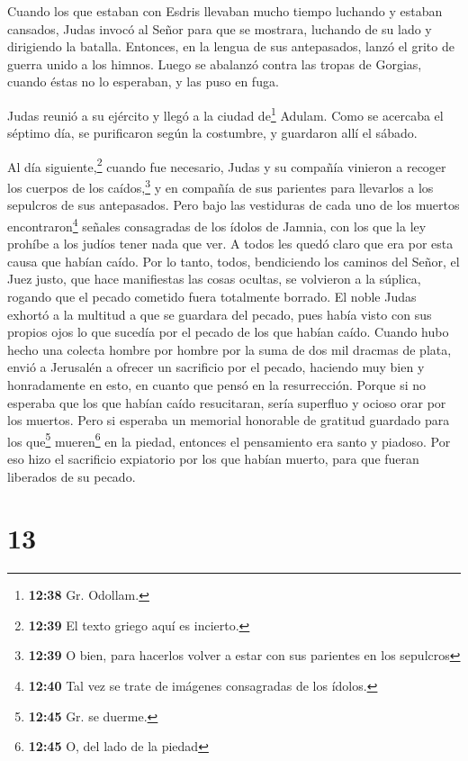  Cuando los que estaban con Esdris llevaban mucho tiempo
luchando y estaban cansados, Judas invocó al Señor para que se mostrara,
luchando de su lado y dirigiendo la batalla.  Entonces,
en la lengua de sus antepasados, lanzó el grito de guerra unido a los
himnos. Luego se abalanzó contra las tropas de Gorgias, cuando éstas no
lo esperaban, y las puso en fuga.

 Judas reunió a su ejército y llegó a la ciudad
de\footnote{\textbf{12:38} Gr. Odollam.} Adulam. Como se acercaba el
séptimo día, se purificaron según la costumbre, y guardaron allí el
sábado.

 Al día siguiente,\footnote{\textbf{12:39} El texto
  griego aquí es incierto.} cuando fue necesario, Judas y su compañía
vinieron a recoger los cuerpos de los caídos,\footnote{\textbf{12:39} O
  bien, para hacerlos volver a estar con sus parientes en los sepulcros}
y en compañía de sus parientes para llevarlos a los sepulcros de sus
antepasados.  Pero bajo las vestiduras de cada uno de los
muertos encontraron\footnote{\textbf{12:40} Tal vez se trate de imágenes
  consagradas de los ídolos.} señales consagradas de los ídolos de
Jamnia, con los que la ley prohíbe a los judíos tener nada que ver. A
todos les quedó claro que era por esta causa que habían caído.
 Por lo tanto, todos, bendiciendo los caminos del Señor,
el Juez justo, que hace manifiestas las cosas ocultas, 
se volvieron a la súplica, rogando que el pecado cometido fuera
totalmente borrado. El noble Judas exhortó a la multitud a que se
guardara del pecado, pues había visto con sus propios ojos lo que
sucedía por el pecado de los que habían caído.  Cuando
hubo hecho una colecta hombre por hombre por la suma de dos mil dracmas
de plata, envió a Jerusalén a ofrecer un sacrificio por el pecado,
haciendo muy bien y honradamente en esto, en cuanto que pensó en la
resurrección.  Porque si no esperaba que los que habían
caído resucitaran, sería superfluo y ocioso orar por los muertos.
 Pero si esperaba un memorial honorable de gratitud
guardado para los que\footnote{\textbf{12:45} Gr. se duerme.}
mueren\footnote{\textbf{12:45} O, del lado de la piedad} en la piedad,
entonces el pensamiento era santo y piadoso. Por eso hizo el sacrificio
expiatorio por los que habían muerto, para que fueran liberados de su
pecado.

\hypertarget{section-12}{%
\section{13}\label{section-12}}

